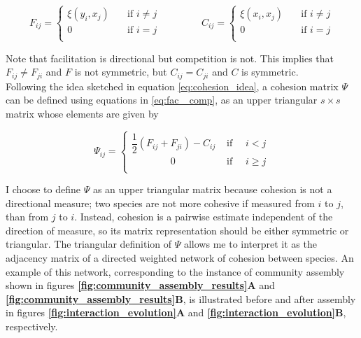 \documentclass[titlepage,11pt]{article}
\begin{document}
\begin{linenumbers}
\begin{singlespace}
					\begin{linenomath*}	
						\begin{equation}\label{eq:fac _comp}	
							F_{ij} = 
							\begin{cases}
							\xi(y_i, x_j)&\quad\text{if } i \neq j \\
							0&\quad\text{if } i = j \\
							\end{cases}
							\hspace{50pt}
							C_{ij} = 
							\begin{cases}
							\xi(x_i, x_j)&\quad\text{if } i \neq j \\
							0&\quad\text{if } i = j \\
							\end{cases}
						\end{equation}
						
					\end{linenomath*}
					Note that facilitation is directional but competition is not. This implies that $ F_{ij} \neq F_{ji}$ and $ F $ is not symmetric, but $ C_{ij} = C_{ji} $ and $ C $ is symmetric.\\
					Following the idea sketched in equation \ref{eq:cohesion_idea}, a cohesion matrix $ \Psi $ can be defined using equations in \ref{eq:fac _comp},  as an upper triangular $ s \times s $ matrix whose elements are given by
					\begin{linenomath*}
						\begin{equation}
							\Psi_{ij} = 
							\begin{cases}
								\dfrac12 \left(F_{ij} + F_{ji}\right) -  C_{ij} & \text{ if }  \quad i < j \\
							    \quad\quad\quad\quad	0 & \text{ if } \quad  i \geq j\\
							\end{cases}
						\end{equation}
					\end{linenomath*}
					I choose to define $ \Psi $ as an upper triangular matrix because  cohesion is not a directional measure; two species are not more cohesive if measured from $ i $ to $ j $, than from $ j $ to $ i $. Instead, cohesion is a pairwise estimate independent of the direction of measure, so its matrix representation should be either symmetric or triangular. The triangular definition of $ \Psi $ allows me to  interpret it as the adjacency matrix of a directed weighted network of cohesion between species. An example of this network, corresponding to the instance of community assembly shown in figures \textbf{\ref{fig:community_assembly_results}A} and \textbf{\ref{fig:community_assembly_results}B}, is illustrated before and after assembly in figures \textbf{\ref{fig:interaction_evolution}A} and \textbf{\ref{fig:interaction_evolution}B}, respectively.


\end{singlespace}
\end{linenumbers}
\end{document}

